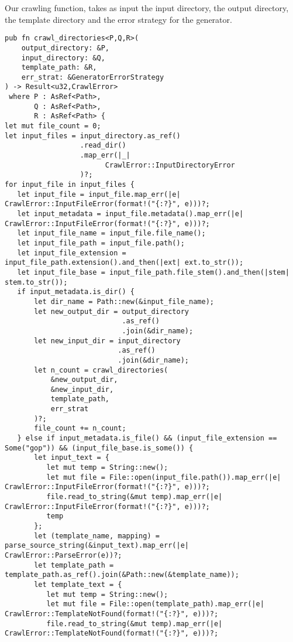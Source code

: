 \documentclass[11pt]{article}
\begin{document}
Our crawling function, takes as input the input directory, the output directory, the template directory and the error strategy for the generator.
\begin{verbatim}
pub fn crawl_directories<P,Q,R>(
    output_directory: &P, 
    input_directory: &Q, 
    template_path: &R, 
    err_strat: &GeneratorErrorStrategy
) -> Result<u32,CrawlError> 
 where P : AsRef<Path>,
       Q : AsRef<Path>,
       R : AsRef<Path> {
let mut file_count = 0;
let input_files = input_directory.as_ref()
                  .read_dir()
                  .map_err(|_| 
                        CrawlError::InputDirectoryError
                  )?;
for input_file in input_files {
   let input_file = input_file.map_err(|e| CrawlError::InputFileError(format!("{:?}", e)))?;
   let input_metadata = input_file.metadata().map_err(|e| CrawlError::InputFileError(format!("{:?}", e)))?;
   let input_file_name = input_file.file_name();
   let input_file_path = input_file.path();
   let input_file_extension = input_file_path.extension().and_then(|ext| ext.to_str());
   let input_file_base = input_file_path.file_stem().and_then(|stem| stem.to_str());
   if input_metadata.is_dir() {
       let dir_name = Path::new(&input_file_name);
       let new_output_dir = output_directory
                            .as_ref()
                            .join(&dir_name);
       let new_input_dir = input_directory
                           .as_ref()
                           .join(&dir_name);
       let n_count = crawl_directories(
           &new_output_dir, 
           &new_input_dir, 
           template_path, 
           err_strat
       )?;
       file_count += n_count;
   } else if input_metadata.is_file() && (input_file_extension == Some("gop")) && (input_file_base.is_some()) {
       let input_text = {
          let mut temp = String::new();
          let mut file = File::open(input_file.path()).map_err(|e| CrawlError::InputFileError(format!("{:?}", e)))?;
          file.read_to_string(&mut temp).map_err(|e| CrawlError::InputFileError(format!("{:?}", e)))?;
          temp
       };
       let (template_name, mapping) = parse_source_string(&input_text).map_err(|e| CrawlError::ParseError(e))?;
       let template_path = template_path.as_ref().join(&Path::new(&template_name));
       let template_text = {
          let mut temp = String::new();
          let mut file = File::open(template_path).map_err(|e| CrawlError::TemplateNotFound(format!("{:?}", e)))?;
          file.read_to_string(&mut temp).map_err(|e| CrawlError::TemplateNotFound(format!("{:?}", e)))?;

\end{verbatim}
\end{document}
